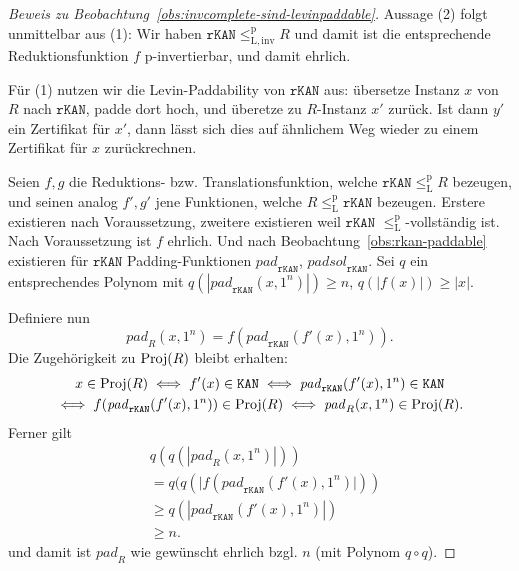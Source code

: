\begin{proof}[Beweis zu Beobachtung~\ref{obs:invcomplete-sind-levinpaddable}]
    Aussage (2) folgt unmittelbar aus (1): Wir haben $\mathtt{rKAN}\leq_\mathrm{L,inv}^\mathrm{p} R$ und damit ist die entsprechende Reduktionsfunktion $f$ p-invertierbar, und damit ehrlich.

    Für (1) nutzen wir die Levin-Paddability von $\mathtt{rKAN}$ aus: übersetze Instanz $x$ von $R$ nach $\mathtt{rKAN}$, padde dort hoch, und überetze zu $R$-Instanz $x'$ zurück. Ist dann $y'$ ein Zertifikat für $x'$, dann lässt sich dies auf ähnlichem Weg wieder zu einem Zertifikat für $x$ zurückrechnen.

    Seien $f, g$ die Reduktions- bzw. Translationsfunktion, welche $\mathtt{rKAN}\leq_\mathrm{L}^\mathrm p R$ bezeugen, und seinen analog $f', g'$ jene Funktionen, welche $R\leq_\mathrm{L}^\mathrm p \mathtt{rKAN}$ bezeugen. Erstere existieren nach Voraussetzung, zweitere existieren weil $\mathtt{rKAN}$ $\leq_\mathrm{L}^\mathrm p$-vollständig ist.
    Nach Voraussetzung ist $f$ ehrlich. %
    Und nach Beobachtung~\ref{obs:rkan-paddable} existieren für $\mathtt{rKAN}$ Padding-Funktionen $\mathit{pad}_\mathtt{rKAN}$, $\mathit{padsol}_\mathtt{rKAN}$.
    Sei $q$ ein entsprechendes Polynom mit $q(|\mathit{pad}_\mathtt{rKAN}(x, 1^n)|)\geq n$, $q(|f(x)|) \geq |x|$.

    Definiere nun
    \[ \mathit{pad}_R(x, 1^n) = f(\mathit{pad}_\mathtt{rKAN}(f'(x), 1^n)). \]
    Die Zugehörigkeit zu $\operatorname{Proj}(R)$ bleibt erhalten:
    \begin{multline*}
        x\in \operatorname{Proj}(R) \iff f'(x) \in \mathtt{KAN} \iff \mathit{pad}_\mathtt{rKAN}(f'(x), 1^n) \in \mathtt{KAN}\\ \iff f(\mathit{pad}_\mathtt{rKAN}(f'(x), 1^n)) \in \operatorname{Proj}(R) \iff \mathit{pad}_R(x, 1^n) \in\operatorname{Proj}(R).
    \end{multline*}
    Ferner gilt
    \begin{align*} &q(q(|\mathit{pad}_R(x, 1^n)|)) \\&= q(q(|f(\mathit{pad}_\mathtt{rKAN}(f'(x), 1^n)|))\\&\geq q(|\mathit{pad}_\mathtt{rKAN}(f'(x), 1^n)|)\\ &\geq n.
    \end{align*}
    und damit ist $\mathit{pad}_R$ wie gewünscht ehrlich bzgl. $n$ (mit Polynom $q\circ q$).


\end{proof}
